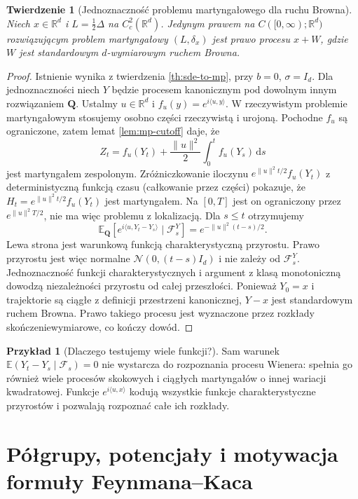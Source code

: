 \documentclass[11pt,a4paper,oneside]{report}
\numberwithin{equation}{chapter}
\theoremstyle{plain}
\newtheorem{twierdzenie}{Twierdzenie}[chapter]
\theoremstyle{definition}
\newtheorem{przyklad}{Przykład}[chapter]
\theoremstyle{remark}
\newcommand{\R}{\mathbb{R}}
\newcommand{\E}{\mathbb{E}}
\newcommand{\calF}{\mathcal{F}}
\newcommand{\dd}{\mathrm{d}}
\newcommand{\norm}[1]{\lVert #1\rVert}
\newcommand{\Normal}{\mathcal{N}}
\begin{document}
\begin{twierdzenie}[Jednoznaczność problemu martyngałowego dla ruchu Browna]
\label{th:mp-bm}
Niech $x\in\R^d$ i $L=\frac12\Delta$ na $C_c^2(\R^d)$.
Jedynym prawem na $C([0,\infty);\R^d)$ rozwiązującym
problem martyngałowy $(L,\delta_x)$ jest prawo procesu
$x+W$, gdzie $W$ jest standardowym $d$-wymiarowym
ruchem Browna.
\end{twierdzenie}
\begin{proof}
Istnienie wynika z twierdzenia \ref{th:sde-to-mp},
przy $b=0$, $\sigma=I_d$. Dla jednoznaczności niech
$Y$ będzie procesem kanonicznym pod dowolnym innym
rozwiązaniem $\mathbf Q$. Ustalmy $u\in\R^d$ i
$f_u(y)=e^{i\langle u,y\rangle}$. W rzeczywistym
problemie martyngałowym stosujemy osobno części rzeczywistą
i urojoną. Pochodne $f_u$ są ograniczone, zatem lemat
\ref{lem:mp-cutoff} daje, że
\[
Z_t=f_u(Y_t)+\frac{\norm u^2}{2}\int_0^t f_u(Y_s)\,\dd s
\]
jest martyngałem zespolonym. Zróżniczkowanie iloczynu
$e^{\norm u^2t/2}f_u(Y_t)$ z deterministyczną funkcją
czasu (całkowanie przez części) pokazuje, że
$H_t=e^{\norm u^2t/2}f_u(Y_t)$ jest martyngałem.
Na $[0,T]$ jest on ograniczony przez $e^{\norm u^2T/2}$,
nie ma więc problemu z lokalizacją.
Dla $s\le t$ otrzymujemy
\[
\E_{\mathbf Q}[e^{i\langle u,Y_t-Y_s\rangle}\mid\calF_s^Y]
=e^{-\norm u^2(t-s)/2}.
\]
Lewa strona jest warunkową funkcją charakterystyczną
przyrostu. Prawo przyrostu jest więc normalne
$\Normal(0,(t-s)I_d)$ i nie zależy od $\calF_s^Y$.
Jednoznaczność funkcji charakterystycznych i
argument z klasą monotoniczną dowodzą niezależności
przyrostu od całej przeszłości. Ponieważ $Y_0=x$ i
trajektorie są ciągłe z definicji przestrzeni kanonicznej,
$Y-x$ jest standardowym ruchem Browna.
Prawo takiego procesu jest wyznaczone przez rozkłady
skończeniewymiarowe, co kończy dowód.
\end{proof}

\begin{przyklad}[Dlaczego testujemy wiele funkcji?]
Sam warunek $\E(Y_t-Y_s\mid\calF_s)=0$ nie wystarcza
do rozpoznania procesu Wienera: spełnia go również
wiele procesów skokowych i ciągłych martyngałów o innej
wariacji kwadratowej. Funkcje
$e^{i\langle u,x\rangle}$ kodują wszystkie
funkcje charakterystyczne przyrostów i pozwalają
rozpoznać całe ich rozkłady.
\end{przyklad}

\section{Półgrupy, potencjały i motywacja formuły Feynmana--Kaca}
\end{document}
